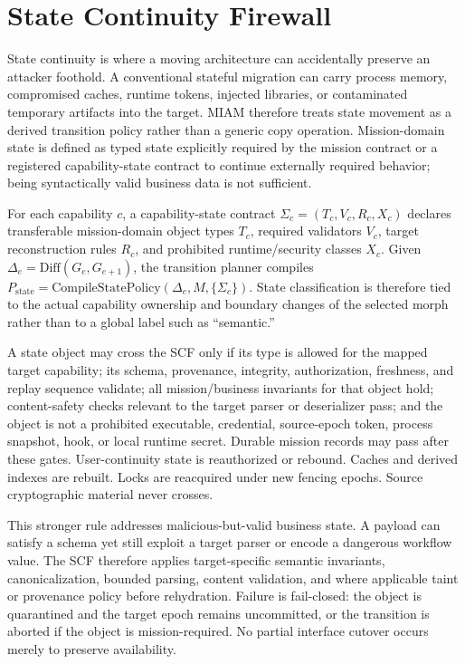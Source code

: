\documentclass[11pt,letterpaper]{article}
\begin{document}
\section{State Continuity Firewall}\label{sec:scf}

State continuity is where a moving architecture can accidentally preserve an attacker foothold. A conventional stateful migration can carry process memory, compromised caches, runtime tokens, injected libraries, or contaminated temporary artifacts into the target. MIAM therefore treats state movement as a derived transition policy rather than a generic copy operation. Mission-domain state is defined as typed state explicitly required by the mission contract or a registered capability-state contract to continue externally required behavior; being syntactically valid business data is not sufficient.

For each capability $c$, a capability-state contract $\Sigma_c=(T_c,V_c,R_c,X_c)$ declares transferable mission-domain object types $T_c$, required validators $V_c$, target reconstruction rules $R_c$, and prohibited runtime/security classes $X_c$. Given $\Delta_e=\mathrm{Diff}(G_e,G_{e+1})$, the transition planner compiles $P_{\mathrm{state}}=\mathrm{CompileStatePolicy}(\Delta_e,M,\{\Sigma_c\})$. State classification is therefore tied to the actual capability ownership and boundary changes of the selected morph rather than to a global label such as ``semantic.''

A state object may cross the SCF only if its type is allowed for the mapped target capability; its schema, provenance, integrity, authorization, freshness, and replay sequence validate; all mission/business invariants for that object hold; content-safety checks relevant to the target parser or deserializer pass; and the object is not a prohibited executable, credential, source-epoch token, process snapshot, hook, or local runtime secret. Durable mission records may pass after these gates. User-continuity state is reauthorized or rebound. Caches and derived indexes are rebuilt. Locks are reacquired under new fencing epochs. Source cryptographic material never crosses.

This stronger rule addresses malicious-but-valid business state. A payload can satisfy a schema yet still exploit a target parser or encode a dangerous workflow value. The SCF therefore applies target-specific semantic invariants, canonicalization, bounded parsing, content validation, and where applicable taint or provenance policy before rehydration. Failure is fail-closed: the object is quarantined and the target epoch remains uncommitted, or the transition is aborted if the object is mission-required. No partial interface cutover occurs merely to preserve availability.
\end{document}
